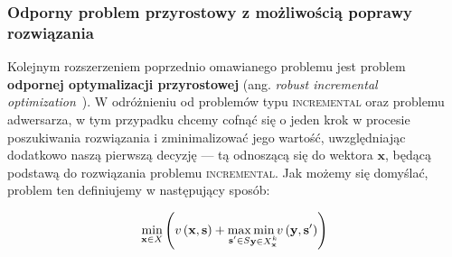 \subsubsection{Odporny problem przyrostowy z możliwością poprawy rozwiązania}

Kolejnym rozszerzeniem poprzednio omawianego problemu jest problem \textbf{odpornej optymalizacji przyrostowej} (ang. \textit{robust incremental optimization}~\cite[$2$]{DBLP:journals/corr/NasrabadiO13}). W odróżnieniu od problemów typu \textsc{incremental} oraz problemu adwersarza, w tym przypadku chcemy cofnąć się o jeden krok w procesie poszukiwania rozwiązania i zminimalizować jego wartość, uwzględniając dodatkowo naszą pierwszą decyzję --- tą odnoszącą się do wektora $\textbf{x}$, będącą podstawą do rozwiązania problemu \textsc{incremental}. Jak możemy się domyślać, problem ten definiujemy w następujący sposób:

\begin{equation}\label{eq:rimstdef}
	\min_{\mathclap{\textbf{x} \in X}} \left( v \left( \textbf{x}, \textbf{s} \right) + \max_{\mathclap{\textbf{s}^{\prime} \in S}} \min_{\mathclap{\textbf{y} \in X^{k}_{\textbf{x}}}} v \left( \textbf{y}, \textbf{s}^{\prime} \right) \right)
\end{equation}

